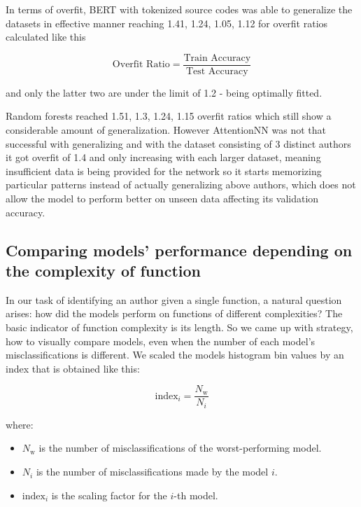 \documentclass[conference]{IEEEtran}
\begin{document}
In terms of overfit, BERT with tokenized source codes was able to generalize the datasets in effective manner reaching 1.41, 1.24, 1.05, 1.12 for overfit ratios 
calculated like this

\begin{equation}
    \text{Overfit Ratio} = \frac{\text{Train Accuracy}}{\text{Test Accuracy}}
\end{equation}

and only the latter two are under the limit of 1.2 - being optimally fitted. 

Random forests reached 1.51, 1.3, 1.24, 1.15 overfit ratios which still show a considerable amount of generalization. However AttentionNN was not that successful with generalizing 
and with the dataset consisting of 3 distinct authors it got overfit of 1.4 and only increasing with each larger dataset, meaning insufficient data is being provided for the network so it starts memorizing particular 
patterns instead of actually generalizing above authors, which does not allow the model to perform better on unseen data affecting its validation accuracy.

\subsection{Comparing models' performance depending on the complexity of function}

In our task of identifying an author given a single function, a natural question arises: how did the models 
perform on functions of different complexities? The basic indicator of function complexity is its length. So we came up with strategy, 
how to visually compare models, even when the number of each model's misclassifications is different. We scaled the models histogram bin values by 
an index that is obtained like this: 

\begin{equation}
    \text{index}_{i} = \frac{N_{\text{w}}}{N_{i}}
\end{equation}

\noindent where:
\begin{itemize}
    \item $N_{\text{w}}$ is the number of misclassifications of the worst-performing model.
    \item $N_{i}$ is the number of misclassifications made by the model \( i \).
    \item $\text{index}_{i}$ is the scaling factor for the $i$-th model.
\end{itemize}
\end{document}

